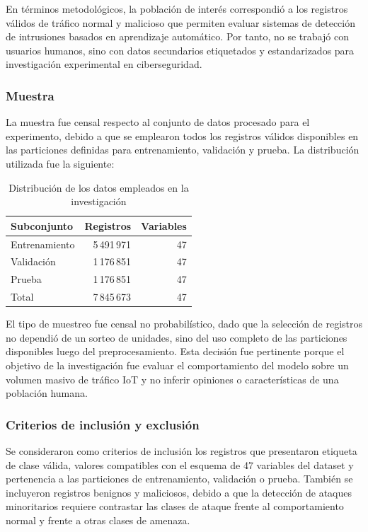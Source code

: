 \documentclass[12pt,a4paper]{article}
\begin{document}
En términos metodológicos, la población de interés correspondió a los registros válidos de tráfico normal y malicioso que permiten evaluar sistemas de detección de intrusiones basados en aprendizaje automático. Por tanto, no se trabajó con usuarios humanos, sino con datos secundarios etiquetados y estandarizados para investigación experimental en ciberseguridad.

\subsubsection{Muestra}

La muestra fue censal respecto al conjunto de datos procesado para el experimento, debido a que se emplearon todos los registros válidos disponibles en las particiones definidas para entrenamiento, validación y prueba. La distribución utilizada fue la siguiente:

\begin{table}[H]
\centering
\caption{Distribución de los datos empleados en la investigación}
\begin{tabular}{lrr}
\toprule
\textbf{Subconjunto} & \textbf{Registros} & \textbf{Variables} \\
\midrule
Entrenamiento & 5\,491\,971 & 47 \\
Validación & 1\,176\,851 & 47 \\
Prueba & 1\,176\,851 & 47 \\
\midrule
Total & 7\,845\,673 & 47 \\
\bottomrule
\end{tabular}
\end{table}

El tipo de muestreo fue censal no probabilístico, dado que la selección de registros no dependió de un sorteo de unidades, sino del uso completo de las particiones disponibles luego del preprocesamiento. Esta decisión fue pertinente porque el objetivo de la investigación fue evaluar el comportamiento del modelo sobre un volumen masivo de tráfico IoT y no inferir opiniones o características de una población humana.

\subsubsection{Criterios de inclusión y exclusión}

Se consideraron como criterios de inclusión los registros que presentaron etiqueta de clase válida, valores compatibles con el esquema de 47 variables del dataset y pertenencia a las particiones de entrenamiento, validación o prueba. También se incluyeron registros benignos y maliciosos, debido a que la detección de ataques minoritarios requiere contrastar las clases de ataque frente al comportamiento normal y frente a otras clases de amenaza.
\end{document}
